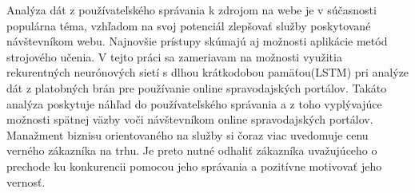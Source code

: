 Analýza dát z používateľského správania k zdrojom na webe je v súčasnosti populárna téma, vzhľadom na svoj potenciál zlepšovať služby poskytované návštevníkom webu. Najnovšie prístupy skúmajú aj možnosti aplikácie metód strojového učenia. 
V tejto práci sa zameriavam na možnosti využitia rekurentných neurónových sietí s dlhou krátkodobou pamäťou(LSTM) pri analýze dát z platobných brán pre používanie online spravodajských portálov. Takáto analýza poskytuje náhľad do používateľského správania a z toho vyplývajúce možnosti spätnej väzby voči návštevníkom online spravodajských portálov. Manažment biznisu orientovaného na služby si čoraz viac uvedomuje cenu verného zákazníka na trhu. Je preto nutné odhaliť zákazníka uvažujúceho o prechode ku konkurencii pomocou jeho správania  a pozitívne motivovať jeho vernosť.

